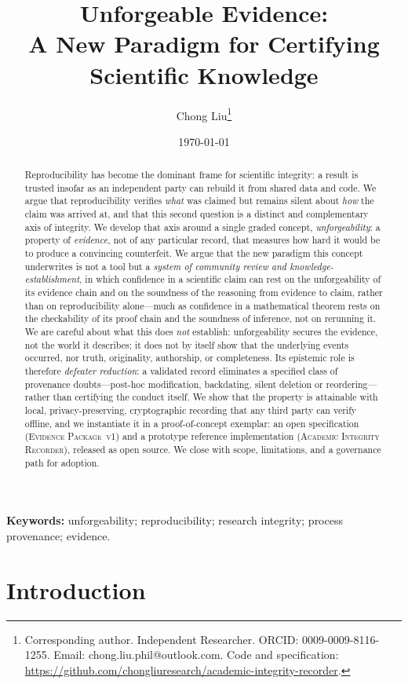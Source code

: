 \documentclass[11pt]{article}
\title{Unforgeable Evidence:\\ A New Paradigm for Certifying\\ Scientific Knowledge}
\author{Chong Liu\thanks{Corresponding author. Independent Researcher.
ORCID: 0009-0009-8116-1255. Email: chong.liu.phil@outlook.com.
Code and specification: \url{https://github.com/chongliuresearch/academic-integrity-recorder}.}}
\date{\today}
\newcommand{\pkg}{\textsc}
\newcommand{\air}{\pkg{Academic Integrity Recorder}\xspace}
\newcommand{\evpkg}{\textsc{Evidence Package~v1}\xspace}
\begin{document}
\maketitle

\begin{abstract}
Reproducibility has become the dominant frame for scientific integrity: a result is
trusted insofar as an independent party can rebuild it from shared data and code. We
argue that reproducibility verifies \emph{what} was claimed but remains silent about
\emph{how} the claim was arrived at, and that this second question is a distinct and
complementary axis of integrity. We develop that axis around a single graded concept,
\emph{unforgeability}: a property of \emph{evidence}, not of any particular record,
that measures how hard it would be to produce a convincing counterfeit. We argue that
the new paradigm this concept underwrites is not a tool but a \emph{system of community
review and knowledge-establishment}, in which confidence in a scientific claim can rest
on the unforgeability of its evidence chain and on the soundness of the reasoning from
evidence to claim, rather than on reproducibility alone---much as confidence in a
mathematical theorem rests on the checkability of its proof chain and the soundness of
inference, not on rerunning it. We are careful about what this does \emph{not}
establish: unforgeability secures the evidence, not the world it describes; it does not
by itself show that the underlying events occurred, nor truth, originality, authorship,
or completeness. Its epistemic role is therefore \emph{defeater reduction}: a validated
record eliminates a specified class of provenance doubts---post-hoc modification,
backdating, silent deletion or reordering---rather than certifying the conduct itself.
We show that the property is attainable with local, privacy-preserving, cryptographic
recording that any third party can verify offline, and we instantiate it in a
proof-of-concept exemplar: an open specification (\evpkg) and a prototype reference
implementation (\air), released as open source. We close with scope, limitations, and a
governance path for adoption.
\end{abstract}

\noindent\textbf{Keywords:} unforgeability; reproducibility; research integrity;
process provenance; evidence.

\section{Introduction}
\label{sec:intro}
\end{document}
